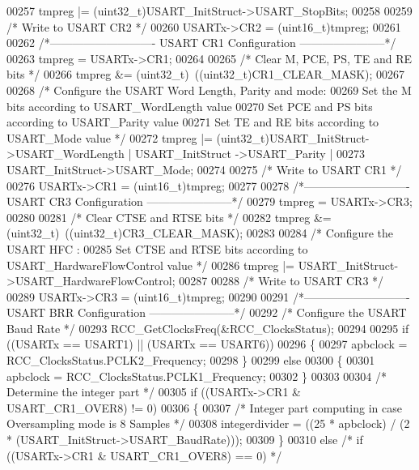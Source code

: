 \begin{DoxyCode}
00257   tmpreg |= (uint32\_t)USART\_InitStruct->USART_StopBits;
00258 
00259   \textcolor{comment}{/* Write to USART CR2 */}
00260   USARTx->CR2 = (uint16\_t)tmpreg;
00261 
00262 \textcolor{comment}{/*---------------------------- USART CR1 Configuration -----------------------*/}
00263   tmpreg = USARTx->CR1;
00264 
00265   \textcolor{comment}{/* Clear M, PCE, PS, TE and RE bits */}
00266   tmpreg &= (uint32\_t)~((uint32\_t)CR1_CLEAR_MASK);
00267 
00268   \textcolor{comment}{/* Configure the USART Word Length, Parity and mode: }
00269 \textcolor{comment}{     Set the M bits according to USART\_WordLength value }
00270 \textcolor{comment}{     Set PCE and PS bits according to USART\_Parity value}
00271 \textcolor{comment}{     Set TE and RE bits according to USART\_Mode value */}
00272   tmpreg |= (uint32\_t)USART\_InitStruct->USART_WordLength | USART\_InitStruct
      ->USART_Parity |
00273             USART\_InitStruct->USART_Mode;
00274 
00275   \textcolor{comment}{/* Write to USART CR1 */}
00276   USARTx->CR1 = (uint16\_t)tmpreg;
00277 
00278 \textcolor{comment}{/*---------------------------- USART CR3 Configuration -----------------------*/}
00279   tmpreg = USARTx->CR3;
00280 
00281   \textcolor{comment}{/* Clear CTSE and RTSE bits */}
00282   tmpreg &= (uint32\_t)~((uint32\_t)CR3_CLEAR_MASK);
00283 
00284   \textcolor{comment}{/* Configure the USART HFC : }
00285 \textcolor{comment}{      Set CTSE and RTSE bits according to USART\_HardwareFlowControl value */}
00286   tmpreg |= USART\_InitStruct->USART_HardwareFlowControl;
00287 
00288   \textcolor{comment}{/* Write to USART CR3 */}
00289   USARTx->CR3 = (uint16\_t)tmpreg;
00290 
00291 \textcolor{comment}{/*---------------------------- USART BRR Configuration -----------------------*/}
00292   \textcolor{comment}{/* Configure the USART Baud Rate */}
00293   RCC_GetClocksFreq(&RCC\_ClocksStatus);
00294 
00295   \textcolor{keywordflow}{if} ((USARTx == USART1) || (USARTx == USART6))
00296   \{
00297     apbclock = RCC\_ClocksStatus.PCLK2_Frequency;
00298   \}
00299   \textcolor{keywordflow}{else}
00300   \{
00301     apbclock = RCC\_ClocksStatus.PCLK1_Frequency;
00302   \}
00303 
00304   \textcolor{comment}{/* Determine the integer part */}
00305   \textcolor{keywordflow}{if} ((USARTx->CR1 & USART_CR1_OVER8) != 0)
00306   \{
00307     \textcolor{comment}{/* Integer part computing in case Oversampling mode is 8 Samples */}
00308     integerdivider = ((25 * apbclock) / (2 * (USART\_InitStruct->USART\_BaudRate)));
00309   \}
00310   \textcolor{keywordflow}{else} \textcolor{comment}{/* if ((USARTx->CR1 & USART\_CR1\_OVER8) == 0) */}

\end{DoxyCode}
